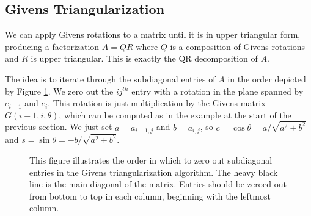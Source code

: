 \subsection*{Givens Triangularization}
We can apply Givens rotations to a matrix until it is in upper triangular form, producing a factorization $A = QR$ where $Q$ is a composition of Givens rotations and $R$ is upper triangular.
This is exactly the QR decomposition of $A$.

The idea is to iterate through the subdiagonal entries of $A$ in the order depicted by Figure \ref{fig:givens}. 
We zero out the $ij^{th}$ entry with a rotation in the plane spanned by $e_{i-1}$ and $e_i$. 
This rotation is just multiplication by the Givens matrix $G(i-1,i,\theta)$, which can be computed as in the example at the start of the previous section. 
We just set $a=a_{i-1,j}$ and $b=a_{i,j}$, so $c = \cos \theta = a/\sqrt{a^2+b^2}$ and $s = \sin \theta = -b/\sqrt{a^2+b^2}$.

\begin{figure}
\begin{center}
\caption{This figure illustrates the order in which to zero out subdiagonal entries in the Givens triangularization algorithm. 
The heavy black line is the main diagonal of the matrix. 
Entries should be zeroed out from bottom to top in each column, beginning with the leftmost column.}
\label{fig:givens}
\end{center}
\end{figure}



